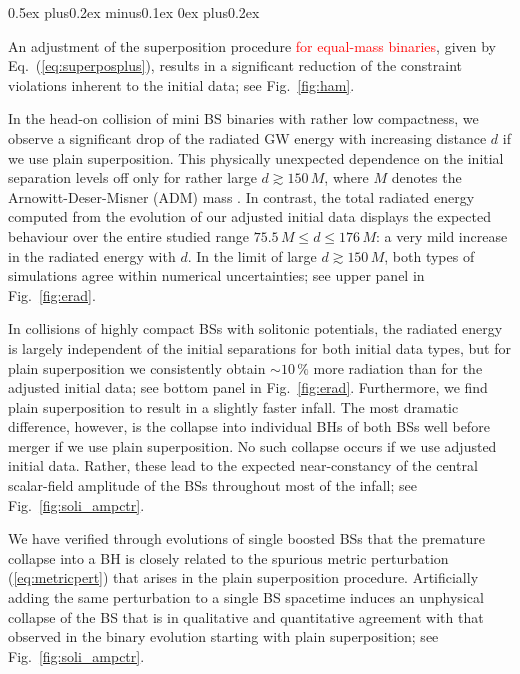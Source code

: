 \documentclass[]{iopart}
\newcommand{\new}[1]{\textcolor{red}{#1}}
\begin{document}
\begin{list}{\rm{\bf ()}}{
                
             \parsep0.5ex plus0.2ex minus0.1ex \itemsep0ex plus0.2ex}
  \item An adjustment of the superposition procedure
  \new{for equal-mass binaries}, given 
  by Eq.~(\ref{eq:superposplus}), results in a significant
  reduction of the constraint violations inherent to the initial data;
  see Fig.~\ref{fig:ham}.
  \item In the head-on collision of mini BS binaries with rather
  low compactness, we observe a significant drop of the radiated
  GW energy with increasing distance $d$ if we use plain superposition.
  This physically unexpected dependence on the initial separation
  levels off only for rather large $d\gtrsim 150\,M$, where $M$
  denotes the Arnowitt-Deser-Misner (ADM) mass \cite{Arnowitt:1962hi}.
  In contrast, the total radiated energy computed from the evolution
  of our adjusted initial data displays the expected behaviour over
  the entire studied range $75.5\,M\le d\le 176\,M$: a very mild
  increase in the radiated energy with $d$. In the limit of large
  $d \gtrsim 150\,M$, both types of simulations agree within numerical
  uncertainties; see upper panel in Fig.~\ref{fig:erad}.
  \item In collisions of highly compact BSs with solitonic potentials,
  the radiated energy is largely independent of the initial separations
  for both initial data types, but for plain superposition we
  consistently obtain $\sim 10\,\%$ more radiation than for the
  adjusted initial data; see bottom panel in Fig.~\ref{fig:erad}.
  Furthermore, we find plain superposition to result in a slightly
  faster infall.  The most dramatic difference, however, is the
  collapse into individual BHs of both BSs well before merger if
  we use plain superposition. No such collapse occurs if we use
  adjusted initial data. Rather, these lead to the expected
  near-constancy of the central scalar-field amplitude of the BSs
  throughout most of the infall; see Fig.~\ref{fig:soli_ampctr}.
  \item We have verified through evolutions of single boosted BSs
  that the premature collapse into a BH is closely related to the
  spurious metric perturbation (\ref{eq:metricpert}) that arises
  in the plain superposition procedure. Artificially adding the
  same perturbation to a single BS spacetime induces an unphysical
  collapse of the BS that is in qualitative and quantitative agreement
  with that observed in the binary evolution starting with plain
  superposition; see Fig.~\ref{fig:soli_ampctr}.
\end{list}
\end{document}
